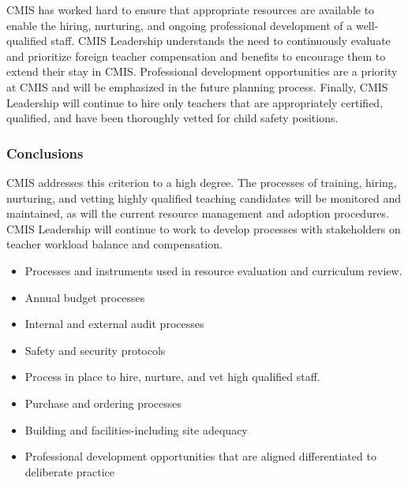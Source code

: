 \begin{findings}

CMIS has worked hard to ensure that appropriate resources are available to enable the hiring, nurturing, and ongoing professional development of a well-qualified staff. CMIS Leadership understands the need to continuously evaluate and prioritize foreign teacher  compensation and benefits to encourage them to extend their stay in CMIS. Professional development opportunities are a priority at CMIS and will be emphasized in the future planning process. Finally, CMIS Leadership will continue to hire only teachers that are appropriately certified, qualified, and have been thoroughly vetted for child safety positions. 
\end{findings}

\subsubsection{Conclusions}

CMIS addresses this criterion to a high degree. The processes of training, hiring, nurturing, and vetting highly qualified teaching candidates will be monitored and maintained, as will the current resource management and adoption procedures. CMIS Leadership will continue to work to develop processes with stakeholders on teacher workload balance and compensation. 


\begin{itemize}
\item Processes and instruments used in resource evaluation and curriculum review. 
\item Annual budget processes
\item Internal and external audit processes 
\item Safety and security protocols
\item Process in place to hire, nurture, and vet high qualified staff. 
\end{itemize}

\begin{itemize}
\item Purchase and ordering processes
\item Building and facilities-including site adequacy
\item Professional development opportunities that are aligned differentiated to deliberate practice 
\end{itemize}


